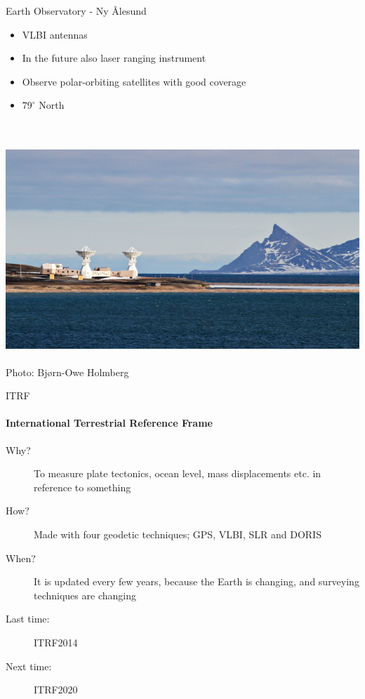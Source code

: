 \documentclass[12pt]{beamer}
\begin{document}
\begin{frame}{Earth Observatory - Ny Ålesund}
 \begin{itemize}
     \item VLBI antennas
     \item In the future also laser ranging instrument
     \item Observe polar-orbiting satellites with good coverage
     \item $79 ^{\circ}$ North
 \end{itemize}\ \\ \ \\
 
 \includegraphics[]{figure/antennebilde.jpg}\ \\ 
  {\small Photo: Bjørn-Owe Holmberg}
\end{frame}


\begin{frame}{ITRF}
\framesubtitle{International Terrestrial Reference Frame}
  \begin{description}
    \item[Why?] To measure plate tectonics, ocean level, mass displacements etc. in reference to something
    \item[How?] Made with four geodetic techniques; GPS, VLBI, SLR and DORIS
    \item[When?] It is updated every few years, because the Earth is changing, and surveying techniques are changing
    \item[Last time:] ITRF2014
    \item[Next time:] ITRF2020
  \end{description}
\end{frame}
\end{document}
